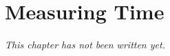 \chapter{Measuring Time}\label{ch:g2:measuring-time}


\emph{This chapter has not been written yet.}

